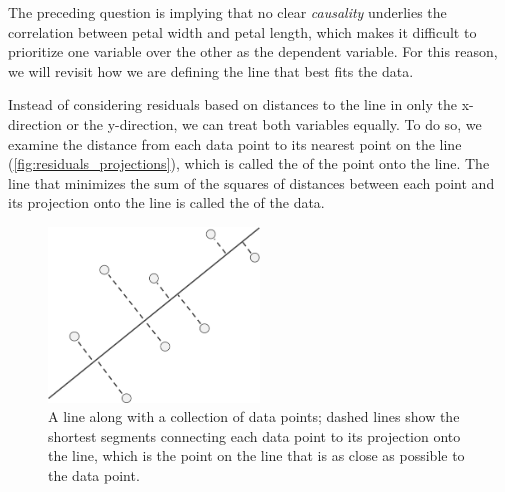 \begin{note}\end{note}

\fudgespace

\begin{qbox}\end{qbox}

The preceding question is implying that no clear \textit{causality} underlies the correlation between petal width and petal length, which makes it difficult to prioritize one variable over the other as the dependent variable. For this reason, we will revisit how we are defining the line that best fits the data.

Instead of considering residuals based on distances to the line in only the x-direction or the y-direction, we can treat both variables equally. To do so, we examine the distance from each data point to its nearest point on the line (\autoref{fig:residuals_projections}), which is called the  of the point onto the line. The line that minimizes the sum of the squares of distances between each point and its projection onto the line is called the  of the data.

\begin{figure}[h]
\centering
\mySfFamily
\includegraphics[width = 0.5\textwidth]{../images/residuals_projections.png}
\caption{A line along with a collection of data points; dashed lines show the shortest segments connecting each data point to its projection onto the line, which is the point on the line that is as close as possible to the data point.}
\label{fig:residuals_projections}
\end{figure}

